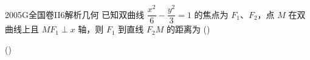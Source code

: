 
\begin{problem}{2005}{G}{全国卷II}{6}{解析几何}
已知双曲线 $ \dfrac{x^2}{6}-\dfrac{y^2}{3}=1 $ 的焦点为 $ F_1 $、$ F_2 $，点 $ M $ 在双曲线上且 $ MF_1\perp x $ 轴，则 $ F_1 $ 到直线 $ F_2M $ 的距离为 (\hspace{1cm})

(\hspace{1cm})
\begin{choices}
\end{choices}
\end{problem}

\begin{answer}

\end{answer}

\begin{solutions}

\end{solutions}